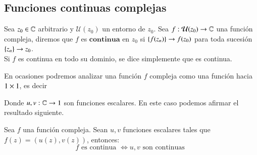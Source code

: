     \subsection{Funciones continuas complejas}
    \begin{dfn}
        Sea $z_0 \in \mathbb{C}$ arbitrario y $\mathcal{U}(z_0)$ un entorno de $z_0$. Sea $f: \mathcal{U}(z_0) \to \mathbb{C}$ una función compleja, diremos que $f$ es $\mathbf{continua}$ en $z_0$ si $\left\{f(z_n)\right\} \to f(z_0)$ para toda sucesión $\left\{z_n\right\} \to z_0$.\\

        Si $f$ es continua en todo su dominio, se dice simplemente que es continua.
    \end{dfn}

    En ocasiones podremos analizar una función $f$ compleja como una función hacia $1 \times 1$, es decir\\


    Donde $u, v: \mathbb{C} \to 1$ son funciones escalares. En este caso podemos afirmar el resultado siguiente.
    \begin{pro}
        Sea $f$ una función compleja. Sean $u, v$ funciones escalares tales que $f(z) = (u(z), v(z))$, entonces:
        $$
            f \text{ es continua } \iff u, v \text{ son continuas }
        $$
    \end{pro}
